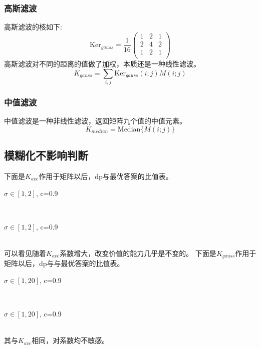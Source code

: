 \documentclass[UTF8]{ctexart}
\begin{document}
\subsubsection{高斯滤波}
高斯滤波的核如下:
$$
    \mathrm{Ker}_{gauss} = \frac{1}{16}\begin{pmatrix}
        1 & 2 & 1\\
        2 & 4 & 2\\
        1 & 2 & 1\\
    \end{pmatrix}
$$
高斯滤波对不同的距离的值做了加权，本质还是一种线性滤波。
$$
    K_{gauss} = \sum_{i,j} \mathrm{Ker}_{gauss}(i;j)M(i;j)
$$
\subsubsection{中值滤波}
中值滤波是一种非线性滤波，返回矩阵九个值的中值元素。
$$
    K_{median} = \mathrm{Median}\{M(i;j)\}
$$
\newpage
\subsection{模糊化不影响判断}
下面是$K_{ave}$作用于矩阵以后，dp与最优答案的比值表。
\begin{table}[h]
    \centering
{}
\caption{$\sigma \in [1,2]$, c=0.9}
\end{table}\\
\begin{table}[h]
    \centering
    \caption{$\sigma \in [1,2]$, c=0.9}
\end{table}\\
\indent 可以看见随着$K_{ave}$系数增大，改变价值的能力几乎是不变的。
\newpage
下面是$K_{gauss}$作用于矩阵以后，dp与与最优答案的比值表。
\begin{table}[h]
    \centering
{}
\caption{$\sigma \in [1,20]$, c=0.9}
\end{table}\\
\begin{table}[h]
    \centering
    \caption{$\sigma \in [1,20]$, c=0.9}
\end{table}\\
其与$K_{ave}$相同，对系数均不敏感。
\end{document}

